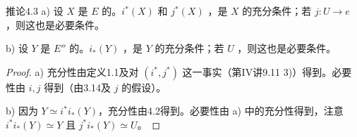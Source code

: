\begin{SGAresult}{推论}{4.3}
a) 设 $X$ 是 $E$ 的。$i^*(X)$ 和 $j^*(X)$ ，是 $X$ 的充分条件；若 $j:U\to e$ ，则这也是必要条件。

b) 设 $Y$ 是 $E''$ 的。$i_*(Y)$ ，是 $Y$ 的充分条件；若 $U$ ，则这也是必要条件。
\end{SGAresult}
\begin{proof}
a) 充分性由定义1.1及对 $(i^*,j^*)$ 这一事实（第IV讲9.11 3)）得到。必要性由 $i,j$ 得到（由3.14及 $j$ 的假设）。

b) 因为 $Y\simeq i^*i_*(Y)$，充分性由4.2得到。必要性由 a) 中的充分性得到，注意 $i^*i_*(Y)\simeq Y$ 且 $j^*i_*(Y)\simeq U$。
\end{proof}


